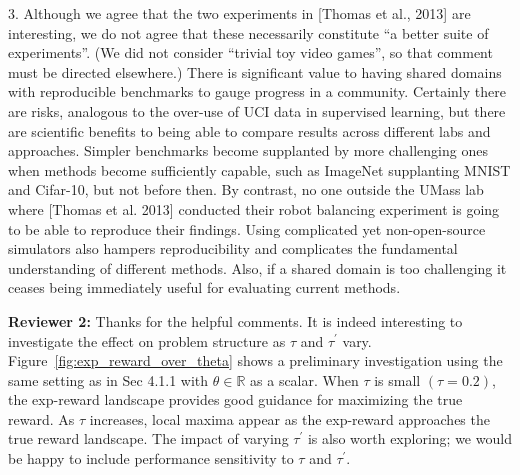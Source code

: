 \documentclass{article}
\begin{document}
3. Although we agree that the two experiments in [Thomas et al., 2013]
are interesting, we do not agree that these necessarily constitute
``a better suite of experiments''.
(We did not consider ``trivial toy video games'',
so that comment must be directed elsewhere.)
There is significant value to having shared domains
with reproducible benchmarks to gauge progress in a community.
Certainly there are risks, 
analogous to the over-use of UCI data in supervised learning,
but there are scientific benefits to being able to compare
results across different labs and approaches.
Simpler benchmarks become supplanted by more challenging ones 
when methods become sufficiently capable, such as ImageNet supplanting MNIST
and Cifar-10, but not before then.
By contrast, no one outside the UMass lab where [Thomas et al. 2013] conducted 
their robot balancing experiment is going to be able to reproduce their
findings.
Using complicated yet non-open-source simulators also hampers reproducibility
and complicates the fundamental understanding of different methods.
Also,
if a shared domain is too challenging
it ceases being immediately useful for evaluating current methods.

\vspace{-0.2cm}

{\bf Reviewer 2: }
%
Thanks for the helpful comments.
It is indeed interesting to investigate the effect on problem structure as 
$\tau$ and $\tau^\prime$ vary.
Figure~\ref{fig:exp_reward_over_theta} shows a preliminary investigation
using the same setting as in Sec 4.1.1 with $\theta \in \mathbb{R}$ as a scalar.
When $\tau$ is small $(\tau =0.2)$,
the exp-reward landscape provides good guidance for maximizing the true reward.
As $\tau$ increases, local maxima appear as the exp-reward approaches the
true reward landscape.
The impact of varying $\tau^\prime$ is also worth exploring;
we would be happy to include
performance sensitivity to $\tau$ and $\tau^\prime$.
\end{document}
